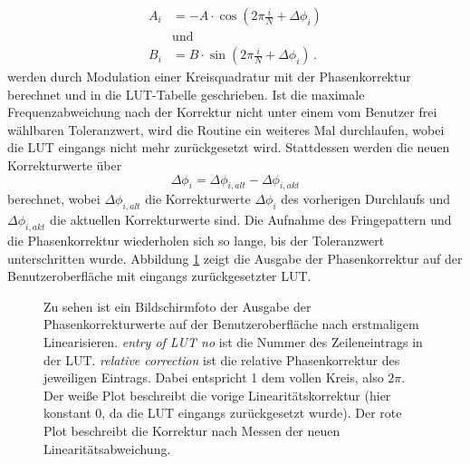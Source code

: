 \begin{equation}\label{eq:LUT_korrektur_01}
	\begin{split}
		A_i&=-A\cdot\cos{\left(2\pi\frac{i}{N}+\Delta\phi_i\right)}\\
		&\text{und}\\
		B_i&=B\cdot\sin{\left(2\pi\frac{i}{N}+\Delta\phi_i\right)}\,.
	\end{split}
\end{equation}
werden durch Modulation einer Kreisquadratur mit der Phasenkorrektur
berechnet und in die LUT-Tabelle geschrieben. Ist die
maximale Frequenzabweichung nach der Korrektur nicht unter einem vom Benutzer
frei wählbaren Toleranzwert, wird die Routine ein weiteres Mal durchlaufen,
wobei die LUT eingangs nicht mehr zurückgesetzt wird. Stattdessen werden die neuen Korrekturwerte über
\begin{equation}\label{eq:LUT_korrektur_02}
	\Delta\phi_i=\Delta\phi_{i,alt}-\Delta\phi_{i,akt}
\end{equation}
berechnet, wobei $\Delta\phi_{i,alt}$ die Korrekturwerte $\Delta\phi_i$
des vorherigen Durchlaufs und $\Delta\phi_{i,akt}$ die aktuellen Korrekturwerte
sind. Die Aufnahme des Fringepattern und die Phasenkorrektur wiederholen sich so
lange, bis der Toleranzwert unterschritten wurde. Abbildung
\ref{fig:linearisierung_benutzeroberflaeche_phasenkorrektur} zeigt die Ausgabe der Phasenkorrektur auf der Benutzeroberfläche mit eingangs zurückgesetzter LUT.\par
\begin{figure}[h]
 	\centering
	\caption[Benutzeroberfläche Linearisierung -
	Phasenkorrektur]{Zu sehen ist ein Bildschirmfoto der Ausgabe der
	Phasenkorrekturwerte auf der Benutzeroberfläche nach erstmaligem Linearisieren.
	\textit{entry
	of LUT no} ist die Nummer des Zeileneintrags in der
	LUT. \textit{relative correction} ist die relative Phasenkorrektur des
	jeweiligen Eintrags. Dabei entspricht 1 dem vollen Kreis, also $2\pi$. Der
	weiße Plot beschreibt die vorige Linearitätskorrektur (hier konstant 0, da
	die LUT eingangs zurückgesetzt wurde). Der rote Plot beschreibt die Korrektur
	nach Messen der neuen
	Linearitätsabweichung.}\label{fig:linearisierung_benutzeroberflaeche_phasenkorrektur}
\end{figure}
